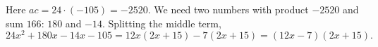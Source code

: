 Here $ac=24\cdot(-105)=-2520$. We need two numbers with product $-2520$ and sum $166$: $180$ and $-14$. Splitting the middle term,
\[24x^2+180x-14x-105=12x(2x+15)-7(2x+15)=\boxed{(12x-7)(2x+15)}.\]
